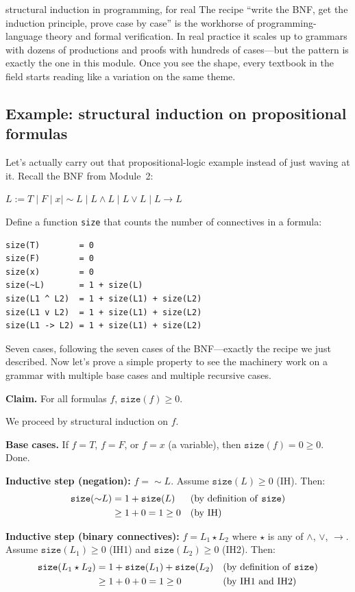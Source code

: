 \documentclass[11pt]{article}
\begin{document}
\begin{sidebar}{structural induction in programming, for real}
The recipe ``write the BNF, get the induction principle, prove case by case'' is the workhorse of programming-language theory and formal verification. In real practice it scales up to grammars with dozens of productions and proofs with hundreds of cases---but the pattern is exactly the one in this module. Once you see the shape, every textbook in the field starts reading like a variation on the same theme.
\end{sidebar}

\subsection{Example: structural induction on propositional formulas}

Let's actually carry out that propositional-logic example instead of just waving at it. Recall the BNF from Module~2:

$L := T \mid F \mid x \mid {\sim} L \mid L \wedge L \mid L \vee L \mid L \to L$

Define a function \texttt{size} that counts the number of connectives in a formula:

\begin{lstlisting}
size(T)        = 0
size(F)        = 0
size(x)        = 0
size(~L)       = 1 + size(L)
size(L1 ^ L2)  = 1 + size(L1) + size(L2)
size(L1 v L2)  = 1 + size(L1) + size(L2)
size(L1 -> L2) = 1 + size(L1) + size(L2)
\end{lstlisting}

Seven cases, following the seven cases of the BNF---exactly the recipe we just described. Now let's prove a simple property to see the machinery work on a grammar with multiple base cases and multiple recursive cases.

\textbf{Claim.} For all formulas $f$, $\texttt{size}(f) \geq 0$.

We proceed by structural induction on $f$.

\textbf{Base cases.} If $f = T$, $f = F$, or $f = x$ (a variable), then $\texttt{size}(f) = 0 \geq 0$. Done.

\textbf{Inductive step (negation):} $f = {\sim} L$. Assume $\texttt{size}(L) \geq 0$ (IH). Then:
\begin{align*}
\texttt{size}({\sim} L) &= 1 + \texttt{size}(L) && \text{(by definition of \texttt{size})} \\
                        &\geq 1 + 0 = 1 \geq 0 && \text{(by IH)}
\end{align*}

\textbf{Inductive step (binary connectives):} $f = L_1 \star L_2$ where $\star$ is any of $\wedge$, $\vee$, $\to$. Assume $\texttt{size}(L_1) \geq 0$ (IH1) and $\texttt{size}(L_2) \geq 0$ (IH2). Then:
\begin{align*}
\texttt{size}(L_1 \star L_2) &= 1 + \texttt{size}(L_1) + \texttt{size}(L_2) && \text{(by definition of \texttt{size})} \\
                              &\geq 1 + 0 + 0 = 1 \geq 0 && \text{(by IH1 and IH2)}
\end{align*}
\end{document}
